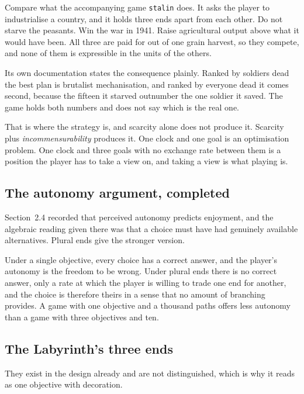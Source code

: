\documentclass[11pt,a4paper]{article}
\begin{document}
Compare what the accompanying game \texttt{stalin} does. It asks the player to industrialise a
country, and it holds three ends apart from each other. Do not starve the peasants. Win the war
in 1941. Raise agricultural output above what it would have been. All three are paid for out of
one grain harvest, so they compete, and none of them is expressible in the units of the others.

\begin{sectionbox}
Its own documentation states the consequence plainly. Ranked by soldiers dead the best plan is
brutalist mechanisation, and ranked by everyone dead it comes second, because the fifteen it
starved outnumber the one soldier it saved. The game holds both numbers and does not say which is
the real one.
\end{sectionbox}

That is where the strategy is, and scarcity alone does not produce it. Scarcity plus
\emph{incommensurability} produces it. One clock and one goal is an optimisation problem. One
clock and three goals with no exchange rate between them is a position the player has to take a
view on, and taking a view is what playing is.

\subsection{The autonomy argument, completed}

Section~2.4 recorded that perceived autonomy predicts enjoyment, and the algebraic reading given
there was that a choice must have had genuinely available alternatives. Plural ends give the
stronger version.

Under a single objective, every choice has a correct answer, and the player's autonomy is the
freedom to be wrong. Under plural ends there is no correct answer, only a rate at which the
player is willing to trade one end for another, and the choice is therefore theirs in a sense
that no amount of branching provides. A game with one objective and a thousand paths offers less
autonomy than a game with three objectives and ten.

\subsection{The Labyrinth's three ends}

They exist in the design already and are not distinguished, which is why it reads as one
objective with decoration.
\end{document}
